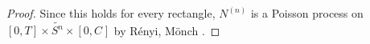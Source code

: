 \documentclass[12pt]{article}
\renewcommand{\S}{S}							%
\newcommand{\carp}[1]{^{#1}}					%
\newcommand{\const}{C}							%
\newcommand{\sln}[1]{^{(#1)}}					%
\newcommand{\poiss}{N}							%
\newcommand{\alt}[1]{\widetilde{#1}}			%
\newcommand{\indx}[1]{_{#1}}					%
\begin{document}
\begin{proof}
Since this holds for every rectangle, \(\poiss\sln{n}\) is a Poisson process on \([0,T]\times \alt{\S\carp{n}}\times [0,\const\indx{}]\) by R\'enyi, M\"onch \cite[Theorem 9.2.XII]{DalVer08}.



\end{proof}
\newpage


\end{document}

